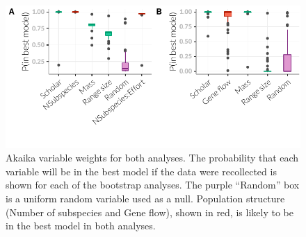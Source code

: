 \begin{knitrout}\footnotesize
{}\color{fgcolor}\begin{figure}[t]

{\centering \includegraphics[width=\textwidth,trim = 0 1cm 0 0]{figure/fstITPlots-1} 

}

\caption[Akaika variable weights for $F_{ST}$ analysis.]{Akaika variable weights for both analyses. The probability that each variable will be in the best model if the data were recollected is shown for each of the bootstrap analyses. The purple ``Random'' box is a uniform random variable used as a null. Population structure (Number of subspecies and Gene flow), shown in red, is likely to be in the best model in both analyses.}\label{fig:fstITPlots}
\end{figure}


\end{knitrout}







